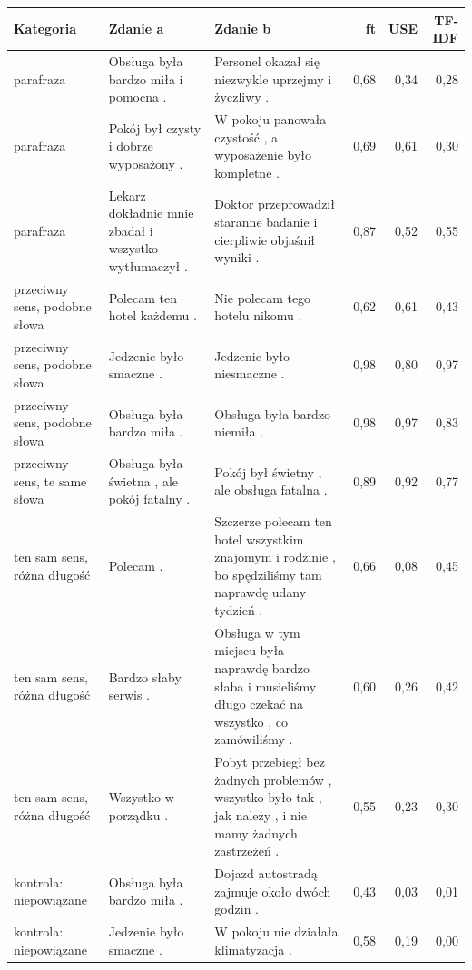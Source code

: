 \begin{tabular}{p{2.6cm}p{4.4cm}p{4.9cm}rrr}
\toprule
Kategoria & Zdanie a & Zdanie b & ft & USE & TF-IDF \\
\midrule
parafraza & Obsługa była bardzo miła i pomocna . & Personel okazał się niezwykle uprzejmy i życzliwy . & 0{,}68 & 0{,}34 & 0{,}28 \\
parafraza & Pokój był czysty i dobrze wyposażony . & W pokoju panowała czystość , a wyposażenie było kompletne . & 0{,}69 & 0{,}61 & 0{,}30 \\
parafraza & Lekarz dokładnie mnie zbadał i wszystko wytłumaczył . & Doktor przeprowadził staranne badanie i cierpliwie objaśnił wyniki . & 0{,}87 & 0{,}52 & 0{,}55 \\
przeciwny sens, podobne słowa & Polecam ten hotel każdemu . & Nie polecam tego hotelu nikomu . & 0{,}62 & 0{,}61 & 0{,}43 \\
przeciwny sens, podobne słowa & Jedzenie było smaczne . & Jedzenie było niesmaczne . & 0{,}98 & 0{,}80 & 0{,}97 \\
przeciwny sens, podobne słowa & Obsługa była bardzo miła . & Obsługa była bardzo niemiła . & 0{,}98 & 0{,}97 & 0{,}83 \\
przeciwny sens, te same słowa & Obsługa była świetna , ale pokój fatalny . & Pokój był świetny , ale obsługa fatalna . & 0{,}89 & 0{,}92 & 0{,}77 \\
ten sam sens, różna długość & Polecam . & Szczerze polecam ten hotel wszystkim znajomym i rodzinie , bo spędziliśmy tam naprawdę udany tydzień . & 0{,}66 & 0{,}08 & 0{,}45 \\
ten sam sens, różna długość & Bardzo słaby serwis . & Obsługa w tym miejscu była naprawdę bardzo słaba i musieliśmy długo czekać na wszystko , co zamówiliśmy . & 0{,}60 & 0{,}26 & 0{,}42 \\
ten sam sens, różna długość & Wszystko w porządku . & Pobyt przebiegł bez żadnych problemów , wszystko było tak , jak należy , i nie mamy żadnych zastrzeżeń . & 0{,}55 & 0{,}23 & 0{,}30 \\
kontrola: niepowiązane & Obsługa była bardzo miła . & Dojazd autostradą zajmuje około dwóch godzin . & 0{,}43 & 0{,}03 & 0{,}01 \\
kontrola: niepowiązane & Jedzenie było smaczne . & W pokoju nie działała klimatyzacja . & 0{,}58 & 0{,}19 & 0{,}00 \\
\bottomrule
\end{tabular}
